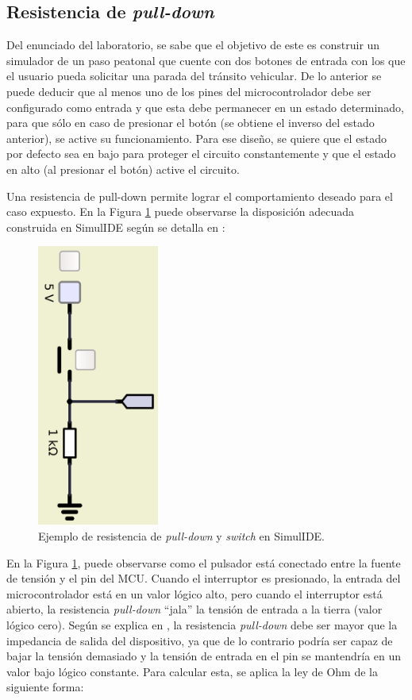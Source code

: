 \subsection{Resistencia de \textit{pull-down}}\label{sec:cir0}
Del enunciado del laboratorio, se sabe que el objetivo de este es construir un simulador de un paso peatonal que cuente con dos botones de entrada con los que el usuario pueda solicitar una parada del tránsito vehicular. De lo anterior se puede deducir que al menos uno de los pines del microcontrolador debe ser configurado como entrada y que esta debe permanecer en un estado determinado, para que sólo en caso de presionar el botón (se obtiene el inverso del estado anterior), se active su funcionamiento. Para ese diseño, se quiere que el estado por defecto sea en bajo para proteger el circuito constantemente y que el estado en alto (al presionar el botón) active el circuito. 

Una resistencia de pull-down permite lograr el comportamiento deseado para el caso expuesto. En la Figura \ref{fig:pullD} puede observarse la disposición adecuada construida en SimulIDE según se detalla en \cite{pullU}: 

\begin{figure}[H]
\centering
\includegraphics[width=40mm]{./Figuras/Nota_teorica/pullD}
\caption{Ejemplo de resistencia de \textit{pull-down} y \textit{switch} en SimulIDE.}
\label{fig:pullD}
\end{figure}

En la Figura \ref{fig:pullD}, puede observarse como el pulsador está conectado entre la fuente de tensión y el pin del MCU. Cuando el interruptor es presionado, la entrada del microcontrolador está en un valor lógico alto, pero cuando el interruptor está abierto, la resistencia \textit{pull-down} ``jala'' la tensión de entrada a la tierra (valor lógico cero). Según se explica en \cite{pullU}, la resistencia \textit{pull-down} debe ser mayor que la impedancia de salida del dispositivo, ya que de lo contrario podría ser capaz de bajar la tensión demasiado y la tensión de entrada en el pin se mantendría en un valor bajo lógico constante. Para calcular esta, se aplica la ley de Ohm de la siguiente forma: 

